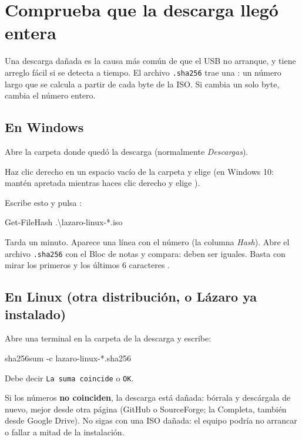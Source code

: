 \section{Comprueba que la descarga llegó entera}\label{sec:sha256}

Una descarga dañada es la causa más común de que el USB no arranque, y
tiene arreglo fácil si se detecta a tiempo. El archivo \texttt{.sha256}
trae una : un número largo que se calcula a
partir de cada byte de la ISO. Si cambia un solo byte, cambia el número
entero.

\subsection*{En Windows}
\begin{pasos}
  \item Abre la carpeta donde quedó la descarga (normalmente \emph{Descargas}).
  \item Haz clic derecho en un espacio vacío de la carpeta y elige
         (en Windows 10: mantén \keys{\shift}
        apretada mientras haces clic derecho y elige ).
  \item Escribe esto y pulsa :
\begin{terminal}
Get-FileHash .\textbackslash lazaro-linux-*.iso
\end{terminal}
  \item Tarda un minuto. Aparece una línea con el número (la columna
        \emph{Hash}). Abre el archivo \texttt{.sha256} con el Bloc de notas y
        compara: deben ser iguales. Basta con mirar los primeros y los
        últimos 6 caracteres \cite{ms-gethash}.
\end{pasos}

\subsection*{En Linux (otra distribución, o Lázaro ya instalado)}
Abre una terminal en la carpeta de la descarga y escribe:
\begin{terminal}
sha256sum -c lazaro-linux-*.sha256
\end{terminal}
Debe decir \texttt{La suma coincide} o \texttt{OK}.

\begin{cuidado}
Si los números \textbf{no coinciden}, la descarga está dañada: bórrala y
descárgala de nuevo, mejor desde otra página (GitHub o SourceForge; la Completa, también desde Google Drive). No
sigas con una ISO dañada: el equipo podría no arrancar o fallar a mitad de
la instalación.
\end{cuidado}

